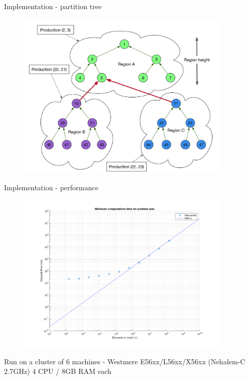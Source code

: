 \documentclass[c]{beamer}
\begin{document}

\begin{frame}{Implementation - partition tree}

   \begin{figure}
      \centering
      \includegraphics[width=0.9\textwidth]{img/graph-idea.png}
    \end{figure}

\end{frame}


\begin{frame}{Implementation - performance}

\begin{figure}
      \centering
      \includegraphics[width=0.9\textwidth]{img/upScalability.png}
    \end{figure}
    
    {\tiny * Run on a cluster of 6 machines - Westmere E56xx/L56xx/X56xx (Nehalem-C 2.7GHz) 4 CPU / 8GB RAM each}

\end{frame}
\end{document}
